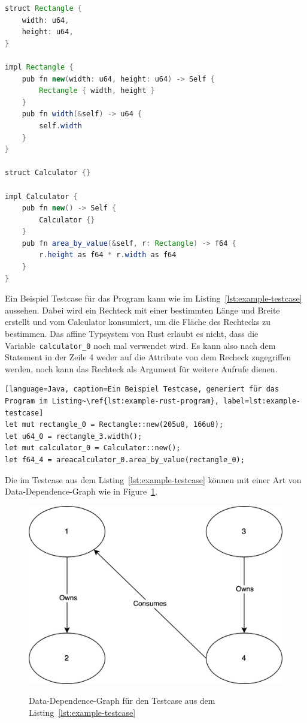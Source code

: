 \documentclass{article}
\begin{document}
\begin{lstlisting}[language=Java, caption=Ein Beispiel für ein Rust Program, label=lst:example-rust-program]
struct Rectangle {
    width: u64,
    height: u64,
}

impl Rectangle {
    pub fn new(width: u64, height: u64) -> Self {
        Rectangle { width, height }
    }
    pub fn width(&self) -> u64 {
        self.width
    }
}

struct Calculator {}

impl Calculator {
    pub fn new() -> Self {
        Calculator {}
    }
    pub fn area_by_value(&self, r: Rectangle) -> f64 {
        r.height as f64 * r.width as f64
    }
}
\end{lstlisting}
Ein Beispiel Testcase für das Program kann wie im Listing~\ref{lst:example-testcase} aussehen. Dabei wird ein Rechteck mit einer bestimmten Länge und Breite erstellt und vom Calculator konsumiert, um die Fläche des Rechtecks zu bestimmen. Das affine Typsystem von Rust erlaubt es nicht, dass die Variable~\lstinline{calculator_0} noch mal verwendet wird. Es kann also nach dem Statement in der Zeile 4 weder auf die Attribute von dem Recheck zugegriffen werden, noch kann das Rechteck als Argument für weitere Aufrufe dienen. 
\begin{lstlisting}[language=Java, caption=Ein Beispiel Testcase, generiert für das Program im Listing~\ref{lst:example-rust-program}, label=lst:example-testcase]
let mut rectangle_0 = Rectangle::new(205u8, 166u8);
let u64_0 = rectangle_3.width();
let mut calculator_0 = Calculator::new();
let f64_4 = areacalculator_0.area_by_value(rectangle_0);
\end{lstlisting}
Die im Testcase aus dem Listing~\ref{lst:example-testcase} können mit einer Art von Data-Dependence-Graph wie in Figure~\ref{fig:ddg-example}.

\begin{figure}[h]
\caption{Data-Dependence-Graph für den Testcase aus dem Listing~\ref{lst:example-testcase}}
\centering
\includegraphics[width=\textwidth]{DDG}
\label{fig:ddg-example}
\end{figure}
\end{document}
